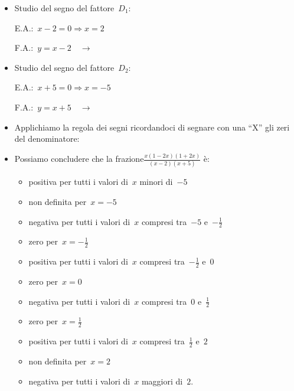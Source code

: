 \begin{esempio}
\begin{itemize} [noitemsep]
 \begin{minipage}{.3\textwidth}
  
 \end{minipage}
 \item Studio del segno del fattore~$D_1$:\\
 \begin{minipage}{.45\textwidth}
  E.A.:~$x-2=0 \Rightarrow x=2$
 \end{minipage}
 \begin{minipage}{.25\textwidth}
  F.A.:~$y=x-2 \quad \rightarrow$
 \end{minipage}
 \begin{minipage}{.3\textwidth}
  
 \end{minipage}
 \item Studio del segno del fattore~$D_2$:\\
 \begin{minipage}{.45\textwidth}
  E.A.:~$x+5=0 \Rightarrow x=-5$
 \end{minipage}
 \begin{minipage}{.25\textwidth}
  F.A.:~$y=x+5 \quad \rightarrow$
 \end{minipage}
 \begin{minipage}{.3\textwidth}
  
 \end{minipage}
 \item Applichiamo la regola dei segni ricordandoci di segnare con una ``X''
  gli zeri del denominatore:
  
 \item Possiamo concludere che la frazione$\frac{x(1 -2 x)(1 + 2 x)}{(x -2)(x
+5)}$ è:
\begin{itemize} [noitemsep]
 \item positiva per tutti i valori di~$x$ minori di~$-5$
 \item non definita per~$x=-5$
 \item negativa per tutti i valori di~$x$ compresi tra~$-5$ e~$-\frac{1}{2}$
 \item zero per~$x=-\frac{1}{2}$
 \item positiva per tutti i valori di~$x$ compresi tra~$-\frac{1}{2}$ e~$0$
 \item zero per~$x=0$
 \item negativa per tutti i valori di~$x$ compresi tra~$0$ e~$\frac{1}{2}$
 \item zero per~$x=\frac{1}{2}$
 \item positiva per tutti i valori di~$x$ compresi tra~$\frac{1}{2}$ e~$2$
 \item non definita per~$x=2$
 \item negativa per tutti i valori di~$x$ maggiori di~$2$.
\end{itemize}
\end{itemize}
 \end{esempio}





